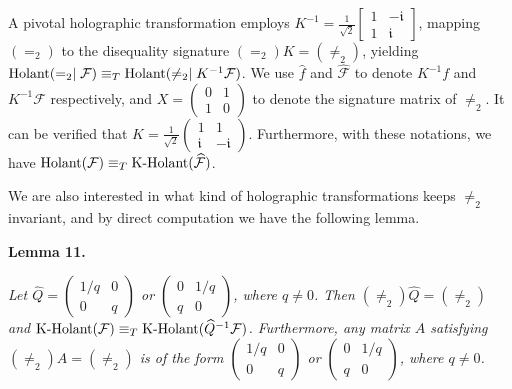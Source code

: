 \documentclass[10pt,a4paper]{article}
\begin{document}
A pivotal holographic transformation employs $K^{-1}=\frac{1}{\sqrt{2}}\begin{bmatrix}1&-\mathfrak{i}\\
1&\mathfrak{i}\end{bmatrix}$, mapping $(=_{2})$ to the disequality signature $(=_{2})K=(\neq_{2})$, yielding $\textup{{Holant}}(=_{2}\mid\mathcal{F})\equiv_{T}\textup{{Holant}}(\neq_{2}\mid K^{-1}\mathcal{F})$. We use $\widehat{f}$ and $\widehat{\mathcal{F}}$ to denote $K^{-1}f$ and $K^{-1}\mathcal{F}$ respectively, and $X=\begin{pmatrix}0&1\\
1&0\end{pmatrix}$ to denote the signature matrix of $\neq_{2}$. It can be verified that $K=\frac{1}{\sqrt{2}}\left(\begin{matrix}1&1\\
\mathfrak{i}&-\mathfrak{i}\end{matrix}\right)$. Furthermore, with these notations, we have $\textup{{Holant}}(\mathcal{F})\equiv_{T}\textup{{K-Holant}}(\widehat{\mathcal{F}})$.\par




We are also interested in what kind of holographic transformations keeps $\neq_{2}$ invariant, and by direct computation we have the following lemma.\par





\par\medskip\noindent\textbf{
\textbf{Lemma 11}\textbf{.}
}\par



\emph{Let $\widehat{Q}=\begin{pmatrix}1/q&0\\
0&q\end{pmatrix}$ or $\begin{pmatrix}0&1/q\\
q&0\end{pmatrix}$, where $q\neq 0$. Then $(\neq_{2})\widehat{Q}=(\neq_{2})$ and $\textup{{K-Holant}}(\mathcal{F})\equiv_{T}\textup{{K-Holant}}(\widehat{Q}^{-1}\mathcal{F})$. Furthermore, any matrix $A$ satisfying $(\neq_{2})A=(\neq_{2})$ is of the form $\begin{pmatrix}1/q&0\\
0&q\end{pmatrix}$ or $\begin{pmatrix}0&1/q\\
q&0\end{pmatrix}$, where $q\neq 0$.}\par
\end{document}

